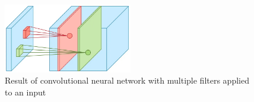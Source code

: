 \begin{figure}[H]
  \centering
  \includegraphics[width=0.5\textwidth]{figures/images/cnn.png}
  \caption[Convolutional neural network output]{Result of convolutional neural network with multiple filters applied to an input \cite{dertat2017applied}}
  \label{fig:cnn}
\end{figure}
